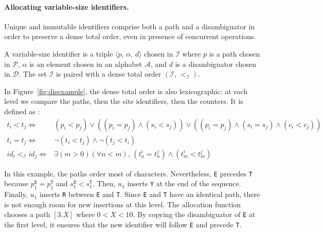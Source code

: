 \paragraph{Allocating variable-size identifiers.}

Unique and immutable identifiers comprise both a path and a disambiguator in
order to preserve a dense total order, even in presence of concurrent
operations.

\begin{definition}
  A variable-size identifier is a triple $\langle p,\, \alpha,\, d \rangle$
  chosen in $\mathcal{I}$ where $p$ is a path chosen in $\mathcal{P}$, $\alpha$
  is an element chosen in an alphabet $\mathcal{A}$, and $d$ is a disambiguator
  chosen in $\mathcal{D}$. The set $\mathcal{I}$ is paired with a dense total
  order $(\mathcal{I},\,<_\mathcal{I})$.
\end{definition}

In Figure~\ref{fig:disexample}, the dense total order is also lexicographic: at
each level we compare the paths, then the site identifiers, then the
counters. It is defined as :
\begin{align*}
  t_i < t_j \iff & (p_i < p_j) \vee  %
                  ((p_i = p_j) \wedge (s_i<s_j)) \vee %
                  ((p_i = p_j) \wedge (s_i = s_j) \wedge (c_i < c_j)) \\
  t_i = t_j \iff & \neg (t_i < t_j) \wedge \neg (t_j < t_i) \\
  id_i <_\mathcal{I} id_j \iff & \exists (m > 0)(\forall n < m),\, (t^i_n = t^j_n) \wedge                             (t^i_m < t^j_m) %
\end{align*}

In this example, the paths order most of characters. Nevertheless, \texttt{E}
precedes \texttt{T} because $p^\texttt{E}_1=p^\texttt{T}_1$ and
$s^\texttt{E}_1 < s^\texttt{T}_1$. Then, $u_1$ inserts \texttt{Y} at the end of
the sequence. Finally, $u_1$ inserts \texttt{R} between \texttt{E} and
\texttt{T}. Since \texttt{E} and \texttt{T} have an identical path, there is not
enough room for new insertions at this level. The allocation function chooses a
path $[3.X]$ where $0<X<10$. By copying the disambiguator of \texttt{E} at the
first level, it ensures that the new identifier will follow \texttt{E} and
precede \texttt{T}.


